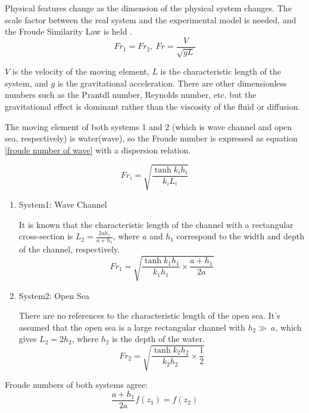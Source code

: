 Physical features change as the dimension of the physical system changes. The scale factor between the real system and the experimental model is needed, and the Froude Similarity Law is held \cite{briggs2013basics, chakrabarti1994offshore}.
\begin{equation}
    Fr_{1} = Fr_{2}, ~Fr = \frac{V}{\sqrt{gL}}
    \label{froude number}
\end{equation}

$V$ is the velocity of the moving element, $L$ is the characteristic length of the system, and $g$ is the gravitational acceleration. There are other dimensionless numbers such as the Prantdl number, Reynolds number, etc. but the gravitational effect is dominant rather than the viscosity of the fluid or diffusion.

The moving element of both systems 1 and 2 (which is wave channel and open sea, respectively) is water(wave), so the Froude number is expressed as equation \ref{froude number of wave} with a dispersion relation.

\begin{equation}
    Fr_i = \sqrt{\frac{\tanh{k_i h_i}}{k_i L_i}}
    \label{froude number of wave}
\end{equation}

\begin{enumerate}
    \item System1: Wave Channel
    
    It is known that the characteristic length of the channel with a rectangular cross-section is $L_2 = \frac{2ah_1}{a+h_1}$, where $a$ and $h_1$ correspond to the width and depth of the channel, respectively.
    \begin{equation}
        Fr_1 = \sqrt{\frac{\tanh{k_1 h_1}}{k_1 h_1} \times \frac{a+h_1}{2a}}
    \end{equation}
    
    \item System2: Open Sea
    
    There are no references to the characteristic length of the open sea. It's assumed that the open sea is a large rectangular channel with $h_2 \gg\ a$, which gives $L_{2} = 2h_{2}$, where $h_2$ is the depth of the water.
    \begin{equation}
        Fr_2 = \sqrt{\frac{\tanh{k_2 h_2}}{k_2 h_2} \times \frac{1}{2}}
    \end{equation}
\end{enumerate}

Froude numbers of both systems agree:
\begin{equation}
    \frac{a+h_1}{2a} f(z_{1})  = f(z_{2})
    \label{froude number equation}
\end{equation}

